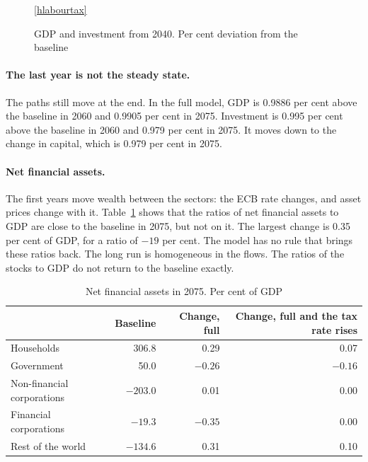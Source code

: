 \documentclass[11pt,a4paper]{article}
\begin{document}
\begin{figure}[H]
\centering
{}

\ref{hlabourtax}
\caption{GDP and investment from 2040. Per cent deviation from the baseline}
\label{fig:labourtax}
\end{figure}

\paragraph{The last year is not the steady state.}
The paths still move at the end. In the full model, GDP is 0.9886 per cent above the baseline in 2060 and 0.9905 per cent in 2075.
Investment is 0.995 per cent above the baseline in 2060 and 0.979 per cent in 2075. It moves down to the change in capital, which is 0.979 per cent in 2075.

\paragraph{Net financial assets.}
The first years move wealth between the sectors: the ECB rate changes, and asset prices change with it. Table~\ref{tab:assets} shows that the ratios of net financial assets to GDP are close to the baseline in 2075, but not on it. The largest change is 0.35 per cent of GDP, for a ratio of $-19$ per cent.
The model has no rule that brings these ratios back. The long run is homogeneous in the flows. The ratios of the stocks to GDP do not return to the baseline exactly.

\begin{table}[H]
\centering
\small
\caption{Net financial assets in 2075. Per cent of GDP}
\label{tab:assets}
\begin{tabular}{@{}lrrr@{}}
\toprule
 & Baseline & Change, full & Change, full and the tax rate rises \\
\midrule
Households & 306.8 & 0.29 & 0.07 \\
Government & 50.0 & $-0.26$ & $-0.16$ \\
Non-financial corporations & $-203.0$ & 0.01 & 0.00 \\
Financial corporations & $-19.3$ & $-0.35$ & 0.00 \\
Rest of the world & $-134.6$ & 0.31 & 0.10 \\
\bottomrule
\end{tabular}
\end{table}
\end{document}
